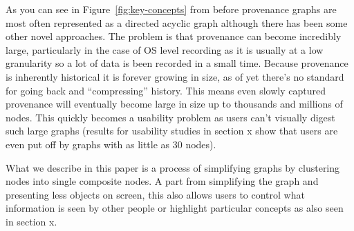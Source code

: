As you can see in Figure~\ref{fig:key-concepts} from before provenance graphs are most often represented as a directed acyclic graph
although there has been some other novel approaches. The problem is that provenance can become incredibly large, particularly in the case of OS level recording as it is usually at a low granularity so a lot of data is been recorded in a small time. Because provenance is inherently historical it is forever growing in size, as of yet there's no standard for going back and ``compressing'' history. This means even slowly captured provenance will eventually become large in size up to thousands and millions of nodes. This quickly becomes a
usability problem as users can't visually digest such large graphs (results for usability studies in section x show that users are even put off by graphs with as little as 30 nodes).

What we describe in this paper is a process of simplifying graphs by clustering nodes into single composite nodes. A part from simplifying the graph and presenting less objects on screen, this also allows users to control what information is seen by other people or highlight particular concepts as also seen in section x.
